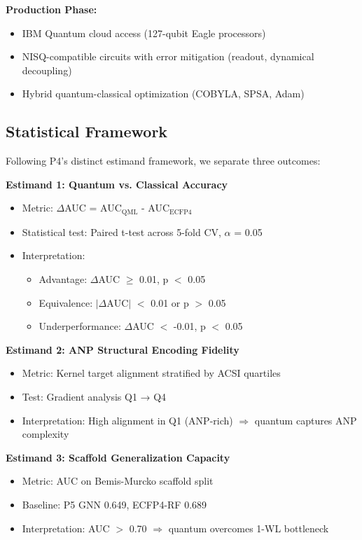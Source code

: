 \documentclass[11pt,a4paper]{article}
\begin{document}
\textbf{Production Phase:}
\begin{itemize}
    \item IBM Quantum cloud access (127-qubit Eagle processors)
    \item NISQ-compatible circuits with error mitigation (readout, dynamical decoupling)
    \item Hybrid quantum-classical optimization (COBYLA, SPSA, Adam)
\end{itemize}

\subsection{Statistical Framework}

Following P4's distinct estimand framework, we separate three outcomes:

\textbf{Estimand 1: Quantum vs. Classical Accuracy}
\begin{itemize}
    \item Metric: $\Delta$AUC = AUC$_{\text{QML}}$ - AUC$_{\text{ECFP4}}$
    \item Statistical test: Paired t-test across 5-fold CV, $\alpha$ = 0.05
    \item Interpretation:
    \begin{itemize}
        \item Advantage: $\Delta$AUC $\geq$ 0.01, p $<$ 0.05
        \item Equivalence: $|\Delta\text{AUC}|$ $<$ 0.01 or p $>$ 0.05
        \item Underperformance: $\Delta$AUC $<$ -0.01, p $<$ 0.05
    \end{itemize}
\end{itemize}

\textbf{Estimand 2: ANP Structural Encoding Fidelity}
\begin{itemize}
    \item Metric: Kernel target alignment stratified by ACSI quartiles
    \item Test: Gradient analysis Q1 → Q4
    \item Interpretation: High alignment in Q1 (ANP-rich) $\Rightarrow$ quantum captures ANP complexity
\end{itemize}

\textbf{Estimand 3: Scaffold Generalization Capacity}
\begin{itemize}
    \item Metric: AUC on Bemis-Murcko scaffold split
    \item Baseline: P5 GNN 0.649, ECFP4-RF 0.689
    \item Interpretation: AUC $>$ 0.70 $\Rightarrow$ quantum overcomes 1-WL bottleneck
\end{itemize}
\end{document}
